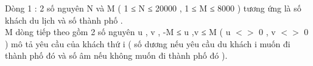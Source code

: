 Dòng 1 : 2 số nguyên N và M ( 1 ≤ N ≤ 20000 , 1 ≤ M ≤ 8000 ) tương ứng là số khách du lịch và số thành phố .   
\\   M dòng tiếp theo gồm 2 số nguyên u , v , -M ≤ u ,v ≤ M ( u $<$$>$ 0 , v $<$$>$ 0 ) mô tả yêu cầu của khách thứ i ( số dương nếu yêu cầu du khách i muốn đi thành phố đó và số âm nếu không muốn đi thành phố đó ).   
\\